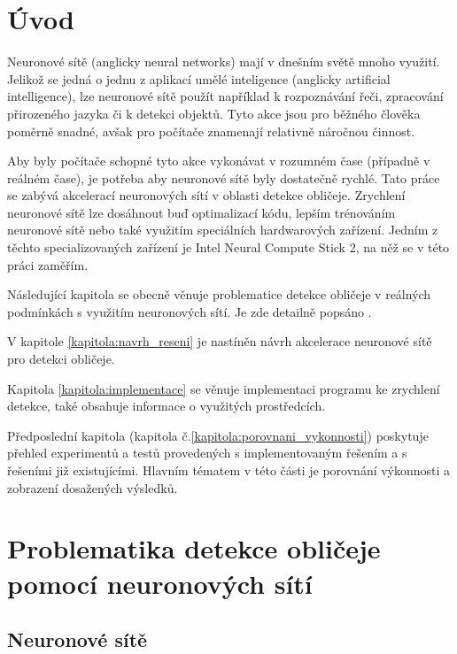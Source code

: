 \chapter{Úvod}
Neuronové sítě (anglicky neural networks) mají v dnešním světě mnoho využití. Jelikož se jedná o jednu z aplikací umělé inteligence (anglicky artificial intelligence), lze neuronové sítě použít například k rozpoznávání řeči, zpracování přirozeného jazyka či k detekci objektů.
Tyto akce jsou pro běžného člověka poměrně snadné, avšak pro počítače znamenají relativně náročnou činnost.

Aby byly počítače schopné tyto akce vykonávat v rozumném čase (případně v reálném čase), je potřeba aby neuronové sítě byly dostatečně rychlé. Tato práce se zabývá akcelerací neuronových sítí v oblasti detekce obličeje. Zrychlení neuronové sítě lze dosáhnout buď optimalizací kódu, lepším trénováním neuronové sítě nebo také využitím speciálních hardwarových zařízení. Jedním z těchto specializovaných zařízení je Intel Neural Compute Stick 2, na něž se v této práci zaměřím. 

Následující kapitola se obecně věnuje problematice detekce obličeje v reálných podmínkách s využitím neuronových sítí. Je zde detailně popsáno .

V kapitole \ref{kapitola:navrh_reseni} je nastíněn návrh akcelerace neuronové sítě pro detekci obličeje. \todo{\blindtext}

Kapitola \ref{kapitola:implementace} se věnuje implementaci programu ke zrychlení detekce, také obsahuje informace o využitých prostředcích.

Předposlední kapitola (kapitola č.\ref{kapitola:porovnani_vykonnosti}) poskytuje přehled experimentů a testů provedených s implementovaným řešením a s řešeními již existujícími. Hlavním tématem v této části je porovnání výkonnosti a zobrazení dosažených výsledků.

\nocite{*}

\chapter{Problematika detekce obličeje pomocí neuronových sítí}
\label{kapitola:problematika_detekce}
\todo{\blindtext}

\section{Neuronové sítě}
\todo{\blindtext}

